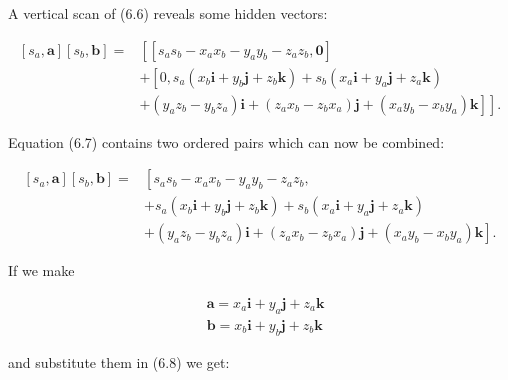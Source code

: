 A vertical scan of (6.6) reveals some hidden vectors:

$$
    \begin{aligned}
        {\left[s_{a}, \mathbf{a}\right]\left[s_{b}, \mathbf{b}\right]=} & {\left[\left[s_{a} s_{b}-x_{a} x_{b}-y_{a} y_{b}-z_{a} z_{b}, \mathbf{0}\right]\right.}                                                                                      \\
                                                                        & +\left[0, s_{a}\left(x_{b} \mathbf{i}+y_{b} \mathbf{j}+z_{b} \mathbf{k}\right)+s_{b}\left(x_{a} \mathbf{i}+y_{a} \mathbf{j}+z_{a} \mathbf{k}\right)\right.                   \\
                                                                        & \left.\left.+\left(y_{a} z_{b}-y_{b} z_{a}\right) \mathbf{i}+\left(z_{a} x_{b}-z_{b} x_{a}\right) \mathbf{j}+\left(x_{a} y_{b}-x_{b} y_{a}\right) \mathbf{k}\right]\right] .
    \end{aligned}
$$

Equation (6.7) contains two ordered pairs which can now be combined:

$$
    \begin{aligned}
        {\left[s_{a}, \mathbf{a}\right]\left[s_{b}, \mathbf{b}\right]=} & {\left[s_{a} s_{b}-x_{a} x_{b}-y_{a} y_{b}-z_{a} z_{b},\right.}                                                                                                 \\
                                                                        & +s_{a}\left(x_{b} \mathbf{i}+y_{b} \mathbf{j}+z_{b} \mathbf{k}\right)+s_{b}\left(x_{a} \mathbf{i}+y_{a} \mathbf{j}+z_{a} \mathbf{k}\right)                      \\
                                                                        & \left.+\left(y_{a} z_{b}-y_{b} z_{a}\right) \mathbf{i}+\left(z_{a} x_{b}-z_{b} x_{a}\right) \mathbf{j}+\left(x_{a} y_{b}-x_{b} y_{a}\right) \mathbf{k}\right] .
    \end{aligned}
$$

If we make

$$
    \begin{aligned}
         & \mathbf{a}=x_{a} \mathbf{i}+y_{a} \mathbf{j}+z_{a} \mathbf{k} \\
         & \mathbf{b}=x_{b} \mathbf{i}+y_{b} \mathbf{j}+z_{b} \mathbf{k}
    \end{aligned}
$$

and substitute them in (6.8) we get:

